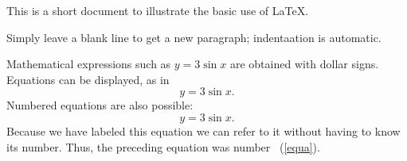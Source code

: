 \documentclass{article}
\begin{document}
This is a short document to illustrate the basic use of \LaTeX.

Simply leave a blank line to get a new paragraph; indentaation is automatic.

Mathematical expressions such as $y = 3 \sin x$ are obtained with dollar signs.
Equations can be displayed, as in
\[
  y = 3 \sin x.
\]
Numbered equations are also possible:
\begin{equation}\label{equa}
  y = 3 \sin x.
\end{equation}
Because we have labeled this equation we can refer to it without having to
know its number. Thus, the preceding equation was number ~(\ref{equa}).
\end{document}
